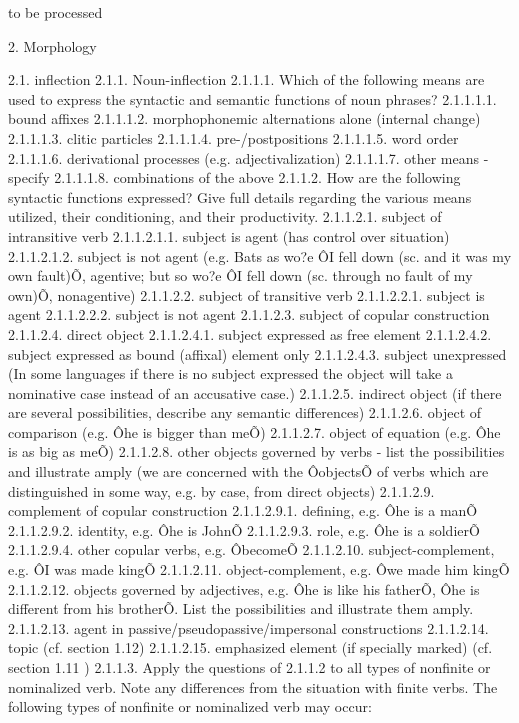 to be processed

2. Morphology

2.1. inflection
2.1.1. Noun-inflection
2.1.1.1. Which of the following means are used to express the syntactic and semantic functions of noun phrases?
2.1.1.1.1. bound affixes
2.1.1.1.2. morphophonemic alternations alone (internal change)
2.1.1.1.3. clitic particles
2.1.1.1.4. pre-/postpositions
2.1.1.1.5. word order
2.1.1.1.6. derivational processes (e.g. adjectivalization)
2.1.1.1.7. other means - specify
2.1.1.1.8. combinations of the above
2.1.1.2. How are the following syntactic functions expressed? Give full details regarding the various means utilized, their conditioning, and their productivity.
2.1.1.2.1. subject of intransitive verb
2.1.1.2.1.1. subject is agent (has control over situation)
2.1.1.2.1.2. subject is not agent
(e.g. Bats as wo?e ÔI fell down (sc. and it was my own fault)Õ, agentive; but so wo?e ÔI fell down (sc. through no fault of my own)Õ, nonagentive)
2.1.1.2.2. subject of transitive verb
2.1.1.2.2.1. subject is agent
2.1.1.2.2.2. subject is not agent
2.1.1.2.3. subject of copular construction
2.1.1.2.4. direct object
2.1.1.2.4.1. subject expressed as free element
2.1.1.2.4.2. subject expressed as bound (affixal) element only
2.1.1.2.4.3. subject unexpressed
(In some languages if there is no subject expressed the object will take a nominative case instead of an accusative case.)
2.1.1.2.5. indirect object (if there are several possibilities, describe any semantic differences)
2.1.1.2.6. object of comparison (e.g. Ôhe is bigger than meÕ)
2.1.1.2.7. object of equation (e.g. Ôhe is as big as meÕ)
2.1.1.2.8. other objects governed by verbs - list the possibilities and illustrate amply (we are concerned with the ÔobjectsÕ of verbs which are distinguished in some way, e.g. by case, from direct objects)
2.1.1.2.9. complement of copular construction
2.1.1.2.9.1. defining, e.g. Ôhe is a manÕ
2.1.1.2.9.2. identity, e.g. Ôhe is JohnÕ
2.1.1.2.9.3. role, e.g. Ôhe is a soldierÕ
2.1.1.2.9.4. other copular verbs, e.g. ÔbecomeÕ
2.1.1.2.10. subject-complement, e.g. ÔI was made kingÕ
2.1.1.2.11. object-complement, e.g. Ôwe made him kingÕ
2.1.1.2.12. objects governed by adjectives, e.g. Ôhe is like his fatherÕ, Ôhe is different from his brotherÕ. List the possibilities and illustrate them amply.
2.1.1.2.13. agent in passive/pseudopassive/impersonal constructions
2.1.1.2.14. topic (cf. section 1.12)
2.1.1.2.15. emphasized element (if specially marked) (cf. section 1.11 )
2.1.1.3. Apply the questions of 2.1.1.2 to all types of nonfinite or nominalized verb. Note any differences from the situation with finite verbs. The following types of nonfinite or nominalized verb may occur:
